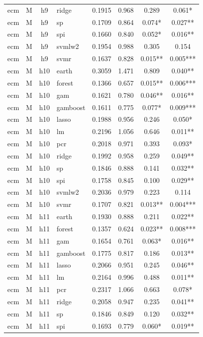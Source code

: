 \begin{ThreePartTable}
\begin{longtable}[t]{llclcccc}
ecm & M & h9 & ridge & 0.1915 & 0.968 & 0.289 & 0.061*\\
ecm & M & h9 & sp & 0.1709 & 0.864 & 0.074* & 0.027**\\
ecm & M & h9 & spi & 0.1660 & 0.840 & 0.052* & 0.016**\\
ecm & M & h9 & svmlw2 & 0.1954 & 0.988 & 0.305 & 0.154\\
ecm & M & h9 & svmr & 0.1637 & 0.828 & 0.015** & 0.005***\\
\addlinespace
ecm & M & h10 & earth & 0.3059 & 1.471 & 0.809 & 0.040**\\
ecm & M & h10 & forest & 0.1366 & 0.657 & 0.015** & 0.006***\\
ecm & M & h10 & gam & 0.1621 & 0.780 & 0.046** & 0.016**\\
ecm & M & h10 & gamboost & 0.1611 & 0.775 & 0.077* & 0.009***\\
ecm & M & h10 & lasso & 0.1988 & 0.956 & 0.246 & 0.050*\\
ecm & M & h10 & lm & 0.2196 & 1.056 & 0.646 & 0.011**\\
ecm & M & h10 & pcr & 0.2018 & 0.971 & 0.393 & 0.093*\\
ecm & M & h10 & ridge & 0.1992 & 0.958 & 0.259 & 0.049**\\
ecm & M & h10 & sp & 0.1846 & 0.888 & 0.141 & 0.032**\\
ecm & M & h10 & spi & 0.1758 & 0.845 & 0.100 & 0.029**\\
ecm & M & h10 & svmlw2 & 0.2036 & 0.979 & 0.223 & 0.114\\
ecm & M & h10 & svmr & 0.1707 & 0.821 & 0.013** & 0.004***\\
\addlinespace
ecm & M & h11 & earth & 0.1930 & 0.888 & 0.211 & 0.022**\\
ecm & M & h11 & forest & 0.1357 & 0.624 & 0.023** & 0.008***\\
ecm & M & h11 & gam & 0.1654 & 0.761 & 0.063* & 0.016**\\
ecm & M & h11 & gamboost & 0.1775 & 0.817 & 0.186 & 0.013**\\
ecm & M & h11 & lasso & 0.2066 & 0.951 & 0.245 & 0.046**\\
ecm & M & h11 & lm & 0.2164 & 0.996 & 0.488 & 0.011**\\
ecm & M & h11 & pcr & 0.2317 & 1.066 & 0.663 & 0.078*\\
ecm & M & h11 & ridge & 0.2058 & 0.947 & 0.235 & 0.041**\\
ecm & M & h11 & sp & 0.1846 & 0.849 & 0.120 & 0.032**\\
ecm & M & h11 & spi & 0.1693 & 0.779 & 0.060* & 0.019**\\

\end{longtable}
\end{ThreePartTable}
